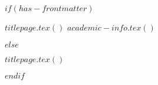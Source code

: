 $if(has-frontmatter)$
  \begin{frontmatter}
  \begin{titlepage}
  $titlepage.tex()$
  $academic-info.tex()$
  
  \end{titlepage}
  \end{frontmatter}
$else$
  \begin{titlepage}
  $titlepage.tex()$
  
  \end{titlepage}
$endif$

  

